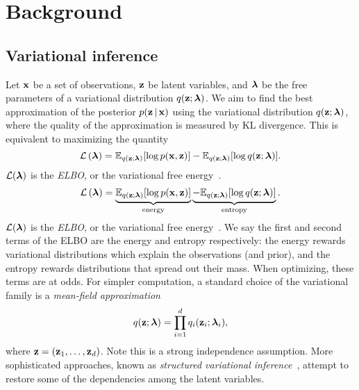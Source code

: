 \section{Background}
\label{sec:background}
\subsection{Variational inference}
\label{subsec:variational}

Let $\boldsymbol{\mathbf{x}}$ be a set of observations, $\boldsymbol{\mathbf{z}}$ be latent variables, and
$\boldsymbol{\mathbf{\lambda}}$ be the free parameters of a variational distribution
$q(\boldsymbol{\mathbf{z}}; \boldsymbol{\mathbf{\lambda}})$. We aim to find the best approximation of the
posterior $p(\boldsymbol{\mathbf{z}}\,|\, \boldsymbol{\mathbf{x}})$ using the variational distribution
$q(\boldsymbol{\mathbf{z}}; \boldsymbol{\mathbf{\lambda}})$, where the quality of the approximation is
measured by KL divergence. This is equivalent to maximizing the
quantity
\begin{equation*}
\mathcal{L}\left(\boldsymbol{\mathbf{\lambda}}\right)
 = \mathbb{E}_{q(\boldsymbol{\mathbf{z}};\boldsymbol{\mathbf{\lambda}})}[\log p(\boldsymbol{\mathbf{x}},\boldsymbol{\mathbf{z}})]
 - \mathbb{E}_{q(\boldsymbol{\mathbf{z}};\boldsymbol{\mathbf{\lambda}})}[\log
 q(\boldsymbol{\mathbf{z}};\boldsymbol{\mathbf{\lambda}})].
\end{equation*}
$\mathcal{L}(\boldsymbol{\mathbf{\lambda}})$ is the \emph{\gls{ELBO}}, or the variational free
energy~\citep{wainwright2008graphical}.
\begin{equation*}
\mathcal{L}\left(\boldsymbol{\mathbf{\lambda}}\right)
 = \underbrace{\mathbb{E}_{q(\boldsymbol{\mathbf{z}};\boldsymbol{\mathbf{\lambda}})}[\log p(\boldsymbol{\mathbf{x}},\boldsymbol{\mathbf{z}})]}_{\text{energy}} \underbrace{- \mathbb{E}_{q(\boldsymbol{\mathbf{z}};\boldsymbol{\mathbf{\lambda}})}[\log
 q(\boldsymbol{\mathbf{z}};\boldsymbol{\mathbf{\lambda}})]}_{\text{entropy}}.
\end{equation*}
$\mathcal{L}(\boldsymbol{\mathbf{\lambda}})$ is the \emph{\gls{ELBO}}, or the variational free
energy~\citep{wainwright2008graphical}.
We say the first and second terms of the \gls{ELBO} are the energy and
entropy respectively: the energy rewards variational distributions
which explain the observations (and prior), and the entropy rewards
distributions that spread out their mass.  When optimizing, these
terms are at odds.
\fi
%
For simpler computation, a standard choice of the variational family
is a \emph{mean-field approximation}
\begin{equation*}
  q(\boldsymbol{\mathbf{z}};\boldsymbol{\mathbf{\lambda}}) = \prod_{i=1}^{d} q_{i}(\boldsymbol{\mathbf{z}}_{i};\boldsymbol{\mathbf{\lambda}}_i),
\end{equation*}
where $\boldsymbol{\mathbf{z}}=(\boldsymbol{\mathbf{\boldsymbol{\mathbf{z}}}}_1,\ldots,\boldsymbol{\mathbf{\boldsymbol{\mathbf{z}}}}_d)$. Note this is a strong independence
assumption.  More sophisticated approaches, known as \emph{structured
  variational inference}~\citep{saul1995exploiting}, attempt to restore
some of the dependencies among the latent variables.

